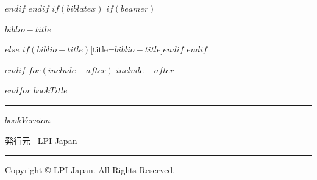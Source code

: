 \documentclass[
$if(fontsize)$
  $fontsize$,
$endif$
$if(papersize)$
  $papersize$paper,
$endif$
$if(beamer)$
  ignorenonframetext,
$if(handout)$
  handout,
$endif$
$if(aspectratio)$
  aspectratio=$aspectratio$,
$endif$
$endif$
$for(classoption)$
  $classoption$$sep$,
$endfor$
]{$documentclass$}
\newif\ifbibliography
\newcounter{none} %
\begin{document}
$endif$
$endif$
$if(biblatex)$
$if(beamer)$
\begin{frame}[allowframebreaks]{$biblio-title$}
  \bibliographytrue
  \printbibliography[heading=none]
\end{frame}
$else$
\printbibliography$if(biblio-title)$[title=$biblio-title$]$endif$
$endif$

$endif$
$for(include-after)$
$include-after$

$endfor$
\newpage
\thispagestyle{empty}
  \vspace*{\fill}
  {\LARGE $bookTitle$}

  \rule{\textwidth}{0.5pt}

  $bookVersion$

  発行元 \, LPI-Japan

  \rule{\textwidth}{0.5pt}

  Copyright \copyright{} LPI-Japan. All Rights Reserved.

  \vspace*{1cm}
\end{document}
